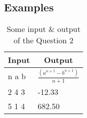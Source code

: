 \subsection*{Examples}
\noindent
\begin{table}[ht!]
\centering
\label{tbl:tabq2}
\begin{tabular}{|p{6cm}|p{6cm}|}
\hline
\multicolumn{1}{|c|}{\textbf{Input}} & \multicolumn{1}{c|}{\textbf{Output}}  \\ \hline
n a b       & \Large $\frac{(a^{n+1}-b^{n+1})}{n+1}$           \\ \hline
2 4 3       & -12.33      \\ \hline
5 1 4       & 682.50           \\ \hline
\end{tabular}
\caption{Some input \& output of the Question 2}
\end{table}